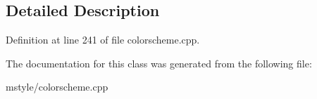\subsection{Detailed Description}


Definition at line 241 of file colorscheme.\+cpp.



The documentation for this class was generated from the following file\+:\begin{DoxyCompactItemize}
\item 
mstyle/colorscheme.\+cpp\end{DoxyCompactItemize}
